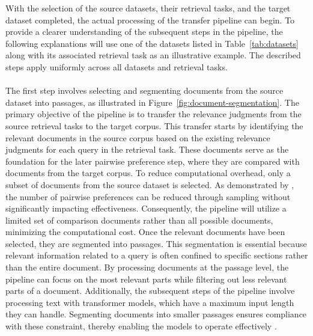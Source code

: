 With the selection of the source datasets, their retrieval tasks, and the target dataset completed, the actual processing of the transfer pipeline can begin. To provide a clearer understanding of the subsequent steps in the pipeline, the following explanations will use one of the datasets listed in Table~\ref{tab:datasets} along with its associated retrieval task as an illustrative example. The described steps apply uniformly across all datasets and retrieval tasks.
\\\\
The first step involves selecting and segmenting documents from the source dataset into passages, as illustrated in Figure~\ref{fig:document-segmentation}. The primary objective of the pipeline is to transfer the relevance judgments from the source retrieval tasks to the target corpus. This transfer starts by identifying the relevant documents in the source corpus based on the existing relevance judgments for each query in the retrieval task. These documents serve as the foundation for the later pairwise preference step, where they are compared with documents from the target corpus. To reduce computational overhead, only a subset of documents from the source dataset is selected. As demonstrated by \mbox{\citet{gienapp:2022}}, the number of pairwise preferences can be reduced through sampling without significantly impacting effectiveness. Consequently, the pipeline will utilize a limited set of comparison documents rather than all possible documents, minimizing the computational cost. Once the relevant documents have been selected, they are segmented into passages. This segmentation is essential because relevant information related to a query is often confined to specific sections rather than the entire document. By processing documents at the passage level, the pipeline can focus on the most relevant parts while filtering out less relevant parts of a document. Additionally, the subsequent steps of the pipeline involve processing text with transformer models, which have a maximum input length they can handle. Segmenting documents into smaller passages ensures compliance with these constraint, thereby enabling the models to operate effectively \citep{levy:2024}.

